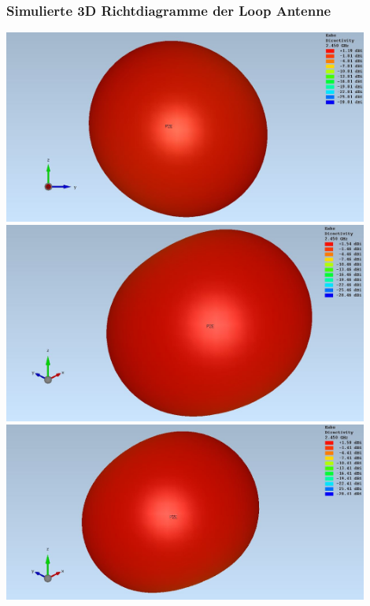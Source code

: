 \subsubsection{Simulierte 3D Richtdiagramme der Loop Antenne}
{
\centering
\includegraphics[width=0.9\textwidth]{content/bilder/Evaluation/Loop/L2/ohneABS/EM_Far_Field_Loop_Lambda2_ohneABS.JPG}
\label{fig:sim_Loop_freiraum_3D}
\medskip
\includegraphics[width=0.9\textwidth]{content/bilder/Evaluation/Loop/L2/1ABS/EM_Far_Field_Loop_Lambda2_mitABS.JPG}
\label{fig:sim_Loop_freiraum_3D_1ABS}
\medskip
\includegraphics[width=0.9\textwidth]{content/bilder/Evaluation/Loop/L2/2ABS/EM_Far_Field_Loop_Lambda2_mit2ABS.JPG}
\label{fig:sim_Loop_freiraum_3D_2ABS}
}
